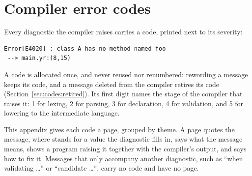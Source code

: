\chapter{Compiler error codes}%
\label{chap:codes}

Every diagnostic the compiler raises carries a code, printed next to its
severity:

\begin{lstlisting}[style=bashVerb]
Error[E4020] : class A has no method named foo
 --> main.yr:(8,15)
\end{lstlisting}

A code is allocated once, and never reused nor renumbered: rewording a message
keeps its code, and a message deleted from the compiler retires its code
(Section~\ref{sec:codes:retired}). Its first digit names the stage of the
compiler that raises it: 1 for lexing, 2 for parsing, 3 for declaration, 4 for
validation, and 5 for lowering to the intermediate language.

This appendix gives each code a page, grouped by theme. A page quotes the
message, where \errhole{} stands for a value the diagnostic fills in, says what
the message means, shows a program raising it together with the compiler's
output, and says how to fix it. Messages that only accompany another
diagnostic, such as ``when validating \ldots'' or ``candidate \ldots'', carry no
code and have no page.

\minitoc%


